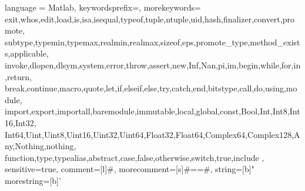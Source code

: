 
%
{ language = Matlab,%
    keywordsprefix=\@,%
    morekeywords={
    exit,whos,edit,load,is,isa,isequal,typeof,tuple,ntuple,uid,hash,finalizer,convert,promote,
    subtype,typemin,typemax,realmin,realmax,sizeof,eps,promote_type,method_exists,applicable,
    invoke,dlopen,dlsym,system,error,throw,assert,new,Inf,Nan,pi,im,begin,while,for,in,return,
    break,continue,macro,quote,let,if,elseif,else,try,catch,end,bitstype,call,do,using,module,
    import,export,importall,baremodule,immutable,local,global,const,Bool,Int,Int8,Int16,Int32,
    Int64,Uint,Uint8,Uint16,Uint32,Uint64,Float32,Float64,Complex64,Complex128,Any,Nothing,nothing,
    function,type,typealias,abstract,case,false,otherwise,switch,true,include
  },%
  sensitive=true, %
  comment=[l]{\#}, %
  morecomment=[s]{\#=}{=\#}, %
  string=[b]" %
  morestring=[b]' %
}


